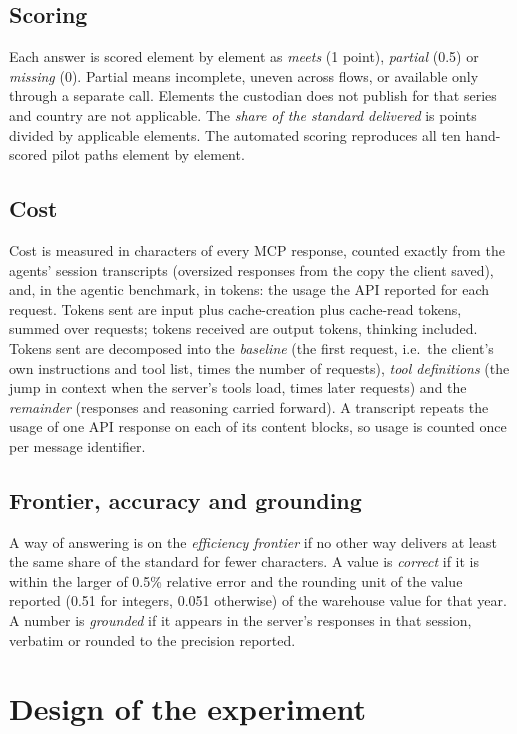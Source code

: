 \documentclass[11pt,a4paper]{article}
\begin{document}
\subsection{Scoring}
Each answer is scored element by element as \emph{meets} (1 point), \emph{partial} (0.5) or \emph{missing} (0). Partial means incomplete, uneven across flows, or available only through a separate call. Elements the custodian does not publish for that series and country are not applicable. The \emph{share of the standard delivered} is points divided by applicable elements. The automated scoring reproduces all ten hand-scored pilot paths element by element.

\subsection{Cost}
Cost is measured in characters of every MCP response, counted exactly from the agents' session transcripts (oversized responses from the copy the client saved), and, in the agentic benchmark, in tokens: the usage the API reported for each request. Tokens sent are input plus cache-creation plus cache-read tokens, summed over requests; tokens received are output tokens, thinking included. Tokens sent are decomposed into the \emph{baseline} (the first request, i.e.\ the client's own instructions and tool list, times the number of requests), \emph{tool definitions} (the jump in context when the server's tools load, times later requests) and the \emph{remainder} (responses and reasoning carried forward). A transcript repeats the usage of one API response on each of its content blocks, so usage is counted once per message identifier.

\subsection{Frontier, accuracy and grounding}
A way of answering is on the \emph{efficiency frontier} if no other way delivers at least the same share of the standard for fewer characters. A value is \emph{correct} if it is within the larger of 0.5\% relative error and the rounding unit of the value reported (0.51 for integers, 0.051 otherwise) of the warehouse value for that year. A number is \emph{grounded} if it appears in the server's responses in that session, verbatim or rounded to the precision reported.

\section{Design of the experiment}\label{sec:design}
\end{document}
